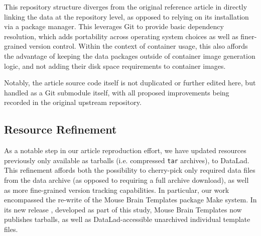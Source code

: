 This repository structure diverges from the original reference article in directly linking the data at the repository level, as opposed to relying on its installation via a package manager.
This leverages Git to provide basic dependency resolution, which adds portability across operating system choices as well as finer-grained version control.
Within the context of container usage, this also affords the advantage of keeping the data packages outside of container image generation logic, and not adding their disk space requirements to container images.

Notably, the article source code itself is not duplicated or further edited here, but handled as a Git submodule itself, with all proposed improvements being recorded in the original upstream repository.





\subsection{Resource Refinement}

As a notable step in our article reproduction effort, we have updated resources previously only available as tarballs (i.e. compressed \texttt{tar} archives), to DataLad.
This refinement affords both the possibility to cherry-pick only required data files from the data archive (as opposed to requiring a full archive download), as well as more fine-grained version tracking capabilities.
In particular, our work encompassed the re-write of the Mouse Brain Templates package \cite{mbt05} Make system.
In its new release \cite{mbt10}, developed as part of this study, Mouse Brain Templates now publishes tarballs, as well as DataLad-accessible unarchived individual template files.


